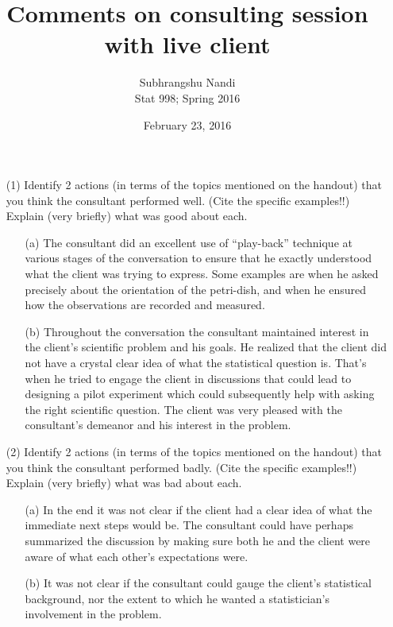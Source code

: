 \documentclass[12pt,a4paper]{article}
\begin{document}
\title{Comments on consulting session with live client}
\author{Subhrangshu Nandi\\
  Stat 998; Spring 2016}
\date{February 23, 2016}

\maketitle

\begin{enumerate}
\item [(1)] Identify 2 actions (in terms of the topics mentioned on the handout) that you think the consultant performed well. (Cite the specific examples!!) Explain (very briefly) what was good about each.
\begin{enumerate}
\item[(a)] The consultant did an excellent use of ``play-back'' technique at various stages of the conversation to ensure that he exactly understood what the client was trying to express. Some examples are when he asked precisely about the orientation of the petri-dish, and when he ensured how the observations are recorded and measured.

\item[(b)] Throughout the conversation the consultant maintained interest in the client's scientific problem and his goals. He realized that the client did not have a crystal clear idea of what the statistical question is. That's when he tried to engage the client in discussions that could lead to designing a pilot experiment which could subsequently help with asking the right scientific question. The client was very pleased with the consultant's demeanor and his interest in the problem.
\end{enumerate}

\item [(2)] Identify 2 actions (in terms of the topics mentioned on the handout) that you think the consultant performed badly. (Cite the specific examples!!) Explain (very briefly) what was bad about each.
\begin{enumerate}
\item[(a)] In the end it was not clear if the client had a clear idea of what the immediate next steps would be. The consultant could have perhaps summarized the discussion by making sure both he and the client were aware of what each other's expectations were. 

\item[(b)] It was not clear if the consultant could gauge the client's statistical background, nor the extent to which he wanted a statistician's involvement in the problem.
\end{enumerate}


\end{enumerate}
\end{document}

